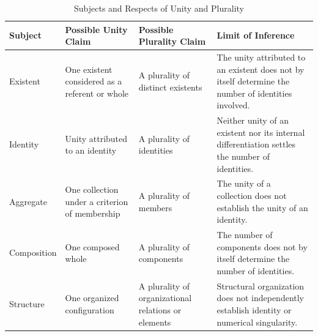 %
%
%
%

\begin{table}[htbp]
\centering
\small
\renewcommand{\arraystretch}{1.35}
\setlength{\tabcolsep}{4pt}

\caption{Subjects and Respects of Unity and Plurality}
\label{tab:subjects-and-respects-of-unity-and-plurality}

\begin{tabular}{|p{2.4cm}|p{3.1cm}|p{3.2cm}|p{4.5cm}|}
\hline
\textbf{Subject} &
\textbf{Possible Unity Claim} &
\textbf{Possible Plurality Claim} &
\textbf{Limit of Inference}
\\
\hline

Existent &
One existent considered as a referent or whole &
A plurality of distinct existents &
The unity attributed to an existent does not by itself determine the number of identities involved.
\\
\hline

Identity &
Unity attributed to an identity &
A plurality of identities &
Neither unity of an existent nor its internal differentiation settles the number of identities.
\\
\hline

Aggregate &
One collection under a criterion of membership &
A plurality of members &
The unity of a collection does not establish the unity of an identity.
\\
\hline

Composition &
One composed whole &
A plurality of components &
The number of components does not by itself determine the number of identities.
\\
\hline

Structure &
One organized configuration &
A plurality of organizational relations or elements &
Structural organization does not independently establish identity or numerical singularity.
\\
\hline


\end{tabular}
\end{table}
